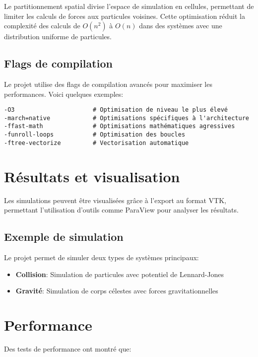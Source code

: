 \documentclass[12pt,a4paper]{article}
\begin{document}
Le partitionnement spatial divise l'espace de simulation en cellules, permettant de limiter les calculs de forces aux particules voisines. Cette optimisation réduit la complexité des calculs de $O(n^2)$ à $O(n)$ dans des systèmes avec une distribution uniforme de particules.

\subsection{Flags de compilation}

Le projet utilise des flags de compilation avancés pour maximiser les performances. Voici quelques exemples:

\begin{verbatim}
-O3                      # Optimisation de niveau le plus élevé
-march=native            # Optimisations spécifiques à l'architecture
-ffast-math              # Optimisations mathématiques agressives
-funroll-loops           # Optimisation des boucles
-ftree-vectorize         # Vectorisation automatique
\end{verbatim}

\section{Résultats et visualisation}

Les simulations peuvent être visualisées grâce à l'export au format VTK, permettant l'utilisation d'outils comme ParaView pour analyser les résultats.

\subsection{Exemple de simulation}

Le projet permet de simuler deux types de systèmes principaux:

\begin{itemize}
    \item \textbf{Collision}: Simulation de particules avec potentiel de Lennard-Jones
    \item \textbf{Gravité}: Simulation de corps célestes avec forces gravitationnelles
\end{itemize}

\section{Performance}

Des tests de performance ont montré que:
\end{document}
